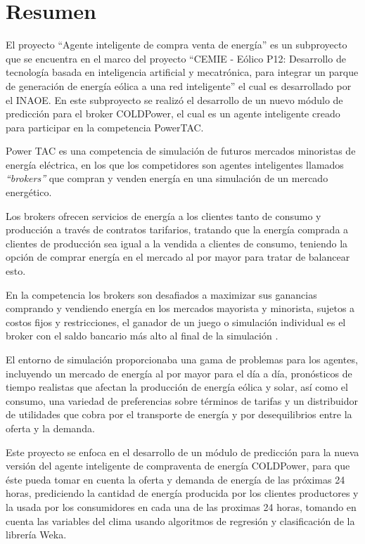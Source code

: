 
	\section*{Resumen}   
El proyecto ``Agente inteligente de compra venta de energía'' es un subproyecto que se encuentra en el marco del proyecto 
``CEMIE - Eólico P12: Desarrollo de tecnología basada en inteligencia artificial y mecatrónica, para integrar un parque de generación de energía eólica a una red inteligente'' 
el cual es desarrollado por el INAOE. 
En este subproyecto se realizó el desarrollo de un nuevo módulo de predicción para el broker COLDPower, el cual es un agente inteligente creado para participar en la competencia PowerTAC. 

Power TAC es una competencia de simulación de futuros mercados minoristas de energía eléctrica, en los que los competidores son agentes inteligentes llamados \textit{``brokers''} que compran y venden energía en una simulación de un mercado energético. 

Los brokers ofrecen servicios de energía a los clientes tanto de consumo y producción a través de contratos tarifarios, tratando que la energía comprada a clientes de producción sea igual a la vendida a clientes de consumo, teniendo la opción de comprar energía en el mercado al por mayor para tratar de balancear esto.

En la competencia los brokers son desafiados a maximizar sus ganancias comprando y vendiendo energía en los mercados mayorista y minorista, sujetos a costos fijos y restricciones, el ganador de un juego o simulación individual es el broker con el saldo bancario más alto al final de la simulación \cite{WKetterJCollinsyMdWeerdtThe2017PowerTAC}.

El entorno  de simulación proporcionaba una gama de problemas para los agentes, incluyendo un mercado de energía al por mayor para el día a día, pronósticos de tiempo realistas que afectan la producción de energía eólica y solar, así como el consumo, una variedad de preferencias sobre términos de tarifas y un distribuidor de utilidades que cobra por el transporte de energía y por desequilibrios entre la oferta y la demanda.

Este proyecto se enfoca en el desarrollo de un módulo de predicción para la nueva versión del agente inteligente de compraventa de energía COLDPower, para que éste pueda tomar en cuenta la oferta y demanda de energía de las próximas 24 horas,  prediciendo la cantidad de energía producida por los clientes productores y la usada por los consumidores en cada una de las proximas 24 horas, tomando en cuenta las variables del clima usando algoritmos de regresión y clasificación de la librería Weka.

